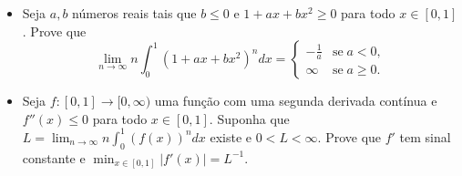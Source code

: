 \begin{itemize}
    \item[(a)] Seja \(a,b\) números reais tais que \(b\leq 0\) e \(1+ax+bx^{2} \geq 0\) para todo \(x\in [0,1]\).
    Prove que
    \[\lim_{n\to \infty} n \int_{0}^{1}(1+ax+bx^{2})^{n}dx= \begin{cases}
    -\frac{1}{a} &\text{se}\; a<0,\\
    \infty & \text{se}\; a \geq 0.
    \end{cases}\]
    \item[(b)] Seja \(f\colon [0,1]\rightarrow[0,\infty)\) uma função com uma segunda derivada contínua e \(f''(x)\leq0\) para todo \(x\in [0,1]\). Suponha que \(L=\lim_{n\to \infty} n \int_{0}^{1}(f(x))^{n}dx\) existe e \(0<L<\infty\). Prove que \(f'\) tem sinal constante e \(\min_{x\in [0,1]}|f'(x)|=L^{-1}\).
\end{itemize}
